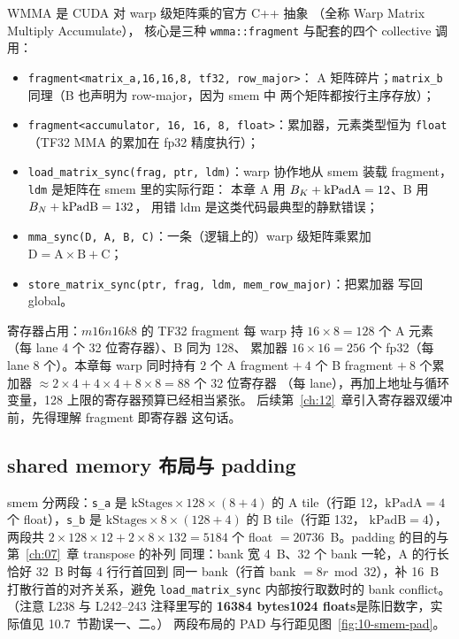 WMMA 是 CUDA 对 warp 级矩阵乘的官方 C++ 抽象
（全称 Warp Matrix Multiply Accumulate），
核心是三种 \texttt{wmma::\allowbreak{}fragment} 与配套的四个 collective 调用：
\begin{itemize}
  \item \texttt{fragment\allowbreak{}<matrix\_\allowbreak{}a,\allowbreak{}16,\allowbreak{}16,\allowbreak{}8,\allowbreak{} tf32,\allowbreak{} row\_\allowbreak{}major>}：
        A 矩阵碎片；\texttt{matrix\_b} 同理（B 也声明为 row-major，因为 smem 中
        两个矩阵都按行主序存放）；
  \item \texttt{fragment\allowbreak{}<accumulator,\allowbreak{} 16,\allowbreak{} 16,\allowbreak{} 8,\allowbreak{} float>}：累加器，元素类型恒为
        \texttt{float}（TF32 MMA 的累加在 fp32 精度执行）；
  \item \texttt{load\_\allowbreak{}matrix\_\allowbreak{}sync\allowbreak{}(frag,\allowbreak{} ptr,\allowbreak{} ldm)}：warp 协作地从 smem 装载
        fragment，\texttt{ldm} 是矩阵在 smem 里的实际行距：
        本章 A 用 $B\sb K + \mathrm{kPadA} = 12$、B 用 $B\sb N + \mathrm{kPadB} = 132$，
        用错 ldm 是这类代码最典型的静默错误；
  \item \texttt{mma\_sync(D, A, B, C)}：一条（逻辑上的）warp 级矩阵乘累加
        $\mathrm{D} = \mathrm{A}\times\mathrm{B} + \mathrm{C}$；
  \item \texttt{store\_\allowbreak{}matrix\_\allowbreak{}sync\allowbreak{}(ptr,\allowbreak{} frag,\allowbreak{} ldm,\allowbreak{} mem\_\allowbreak{}row\_\allowbreak{}major)}：把累加器
        写回 global。
\end{itemize}
寄存器占用：$m16n16k8$ 的 TF32 fragment 每 warp 持
$16\times8 = 128$ 个 A 元素（每 lane 4 个 32 位寄存器）、B 同为 128、
累加器 $16\times16 = 256$ 个 fp32（每 lane 8 个）。本章每 warp 同时持有
$2$ 个 A fragment $+\ 4$ 个 B fragment $+\ 8$ 个累加器
$\approx 2{\times}4 + 4{\times}4 + 8{\times}8 = 88$ 个 32 位寄存器
（每 lane），再加上地址与循环变量，128 上限的寄存器预算已经相当紧张。
后续第~\ref{ch:12}~章引入寄存器双缓冲前，先得理解 fragment 即寄存器
这句话。

\subsection{shared memory 布局与 padding}



smem 分两段：\texttt{s\_a} 是 $\mathrm{kStages}\times 128\times(8+4)$ 的
A tile（行距 12，$\mathrm{kPadA}=4$ 个 float），\texttt{s\_b} 是
$\mathrm{kStages}\times 8\times(128+4)$ 的 B tile（行距 132，
$\mathrm{kPadB}=4$），两段共 $2\times128\times12 + 2\times8\times132 = 5184$
个 float $= 20736$~B。padding 的目的与第~\ref{ch:07}~章 transpose 的补列
同理：bank 宽 4~B、32 个 bank 一轮，A 的行长恰好 32~B 时每 4 行行首回到
同一 bank（行首 bank $=8r \bmod 32$），补 16~B 打散行首的对齐关系，避免 \texttt{load\_\allowbreak{}matrix\_\allowbreak{}sync}
内部按行取数时的 bank conflict。（注意 L238 与 L242--243 注释里写的
\textbf{16384 bytes}\textbf{1024 floats}是陈旧数字，实际值见 10.7~节勘误一、二。）
两段布局的 PAD 与行距见图~\ref{fig:10-smem-pad}。

